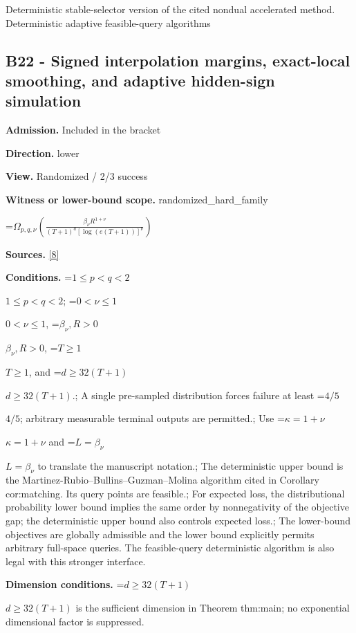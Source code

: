\documentclass[10pt,a4paper]{article}
\newcommand{\AtlasMath}[1]{\par\begingroup\centering\setbox0=\hbox{$\displaystyle #1$}\ifdim\wd0>1.4\linewidth\typeout{ATLAS WIDE FORMULA: \the\wd0}\fi\ifdim\wd0>\linewidth\resizebox{\linewidth}{!}{\box0}\else\box0\fi\par\endgroup}
\newcommand{\AtlasInlineMath}[1]{\begingroup\setbox0=\hbox{$#1$}\ifdim\wd0>.4\linewidth\endgroup\AtlasMath{#1}\else\endgroup$#1$\fi}
\begin{document}
Deterministic stable-selector version of the cited nondual accelerated method. Deterministic adaptive feasible-query algorithms



\subsection{B22 - Signed interpolation margins, exact-local smoothing, and adaptive hidden-sign simulation}


\textbf{Admission.} Included in the bracket



\textbf{Direction.} lower



\textbf{View.} Randomized / 2/3 success



\textbf{Witness or lower-bound scope.} randomized\_hard\_family



\AtlasMath{\Omega_{p,q,\nu}\!\left(\frac{\beta_\nu R^{1+\nu}}{(T+1)^a[\log(e(T+1))]^\nu}\right)}


\textbf{Sources.} \href{https://github.com/WU-Wendao/Colombo/blob/main/colombo_sensorium/Complexity_altas/data/sources/colombo/B1/manuscript.pdf}{[8]}



\textbf{Conditions.} \AtlasInlineMath{1\le p<q<2}; \AtlasInlineMath{0<\nu\le1}, \AtlasInlineMath{\beta_\nu,R>0}, \AtlasInlineMath{T\ge1}, and \AtlasInlineMath{d\ge32(T+1)}.; A single pre-sampled distribution forces failure at least \AtlasInlineMath{4/5}; arbitrary measurable terminal outputs are permitted.; Use \AtlasInlineMath{\kappa=1+\nu} and \AtlasInlineMath{L=\beta_\nu} to translate the manuscript notation.; The deterministic upper bound is the Martinez-Rubio--Bullins--Guzman--Molina algorithm cited in Corollary cor:matching. Its query points are feasible.; For expected loss, the distributional probability lower bound implies the same order by nonnegativity of the objective gap; the deterministic upper bound also controls expected loss.; The lower-bound objectives are globally admissible and the lower bound explicitly permits arbitrary full-space queries. The feasible-query deterministic algorithm is also legal with this stronger interface.



\textbf{Dimension conditions.} \AtlasInlineMath{d\ge32(T+1)} is the sufficient dimension in Theorem thm:main; no exponential dimensional factor is suppressed.
\end{document}
